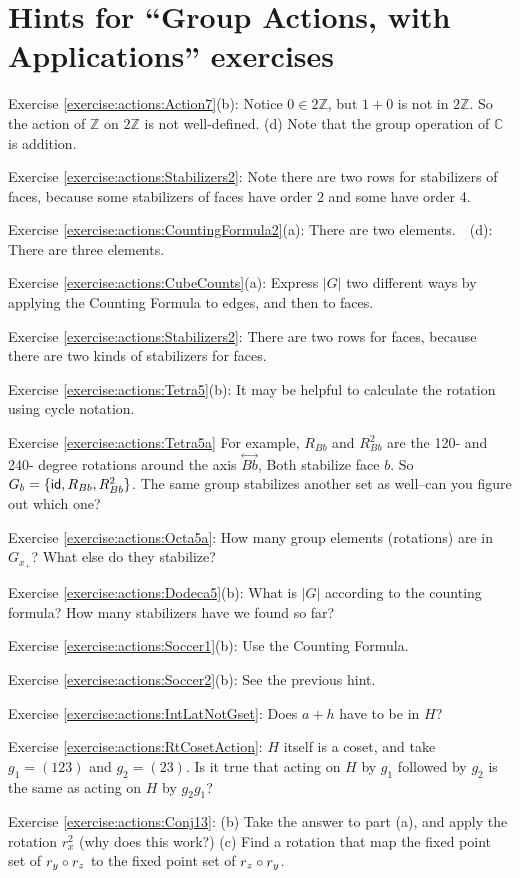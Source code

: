 \section{Hints for ``Group Actions, with Applications'' exercises}\label{sec:actions:hints} 


\noindent Exercise \ref{exercise:actions:Action7}(b): Notice $0 \in 2\mathbb{Z}$, but $1+0$ is not in $2\mathbb{Z}$. So the action of $\mathbb{Z}$ on $2\mathbb{Z}$ is not well-defined. (d) Note that the group operation of $\mathbb{C}$ is addition.

\noindent Exercise \ref{exercise:actions:Stabilizers2}: Note there are two rows for stabilizers of faces, because some stabilizers of faces have order 2 and some have order 4.

\noindent Exercise \ref{exercise:actions:CountingFormula2}(a):   There are two elements.~~(d):   There are three elements.

\noindent Exercise \ref{exercise:actions:CubeCounts}(a):   Express $|G|$ two different ways by applying the Counting Formula to edges, and then to faces.

\noindent Exercise \ref{exercise:actions:Stabilizers2}:   There are two rows for faces, because there are two kinds of stabilizers for faces.

\noindent Exercise \ref{exercise:actions:Tetra5}(b): It may be helpful to calculate the rotation using cycle notation.

\noindent Exercise \ref{exercise:actions:Tetra5a} For example, $R_{Bb}$ and  $R_{Bb}^2$ are the 120- and 240- degree rotations around the axis $\overset{\leftrightarrow}{Bb}$, Both stabilize face $b$. So 
$G_b = \{ {\sf{i}d}, R_{Bb}, R_{Bb}^2 \}$. The same group stabilizes another set as well--can you figure out which one?  


\noindent Exercise \ref{exercise:actions:Octa5a}: How many group elements (rotations) are in $G_{x_+}$?  What else do they stabilize?

\noindent Exercise \ref{exercise:actions:Dodeca5}(b): What is $|G|$ according to the counting formula?  How many stabilizers have we found so far?

\noindent Exercise \ref{exercise:actions:Soccer1}(b): Use the Counting Formula.

\noindent Exercise \ref{exercise:actions:Soccer2}(b): See the previous hint.

\noindent Exercise \ref{exercise:actions:IntLatNotGset}: Does $a+h$ have to be in $H$?

\noindent Exercise \ref{exercise:actions:RtCosetAction}: $H$ itself is a coset, and take $g_1=(123)$ and $g_2=(23)$.  Is it true that acting on $H$ by $g_1$ followed by $g_2$ is the same as acting on $H$ by $g_2 g_1$?

\noindent Exercise \ref{exercise:actions:Conj13}: (b) Take the answer to part (a), and apply the rotation $r_x^2$ (why does this work?)  (c) Find a rotation that map the fixed point set of $r_y\circ r_z$ to the fixed point set of  $r_z\circ r_y$.
